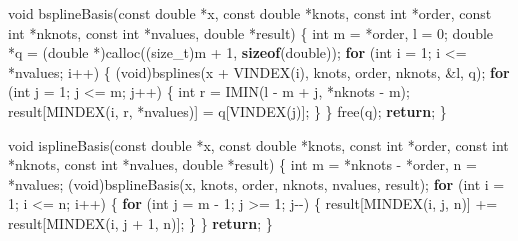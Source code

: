 \documentclass[
  12pt,
]{article}
\newenvironment{Shaded}{\begin{snugshade}}{\end{snugshade}}
\newcommand{\ControlFlowTok}[1]{\textcolor[rgb]{0.13,0.29,0.53}{\textbf{#1}}}
\newcommand{\DataTypeTok}[1]{\textcolor[rgb]{0.13,0.29,0.53}{#1}}
\newcommand{\DecValTok}[1]{\textcolor[rgb]{0.00,0.00,0.81}{#1}}
\newcommand{\KeywordTok}[1]{\textcolor[rgb]{0.13,0.29,0.53}{\textbf{#1}}}
\newcommand{\NormalTok}[1]{#1}
\begin{document}
\begin{Shaded}
\begin{Highlighting}[]
\DataTypeTok{void}\NormalTok{ bsplineBasis(}\DataTypeTok{const} \DataTypeTok{double}\NormalTok{ *x, }\DataTypeTok{const} \DataTypeTok{double}\NormalTok{ *knots, }\DataTypeTok{const} \DataTypeTok{int}\NormalTok{ *order,}
                  \DataTypeTok{const} \DataTypeTok{int}\NormalTok{ *nknots, }\DataTypeTok{const} \DataTypeTok{int}\NormalTok{ *nvalues, }\DataTypeTok{double}\NormalTok{ *result) \{}
    \DataTypeTok{int}\NormalTok{ m = *order, l = }\DecValTok{0}\NormalTok{;}
    \DataTypeTok{double}\NormalTok{ *q = (}\DataTypeTok{double}\NormalTok{ *)calloc((}\DataTypeTok{size\_t}\NormalTok{)m + }\DecValTok{1}\NormalTok{, }\KeywordTok{sizeof}\NormalTok{(}\DataTypeTok{double}\NormalTok{));}
    \ControlFlowTok{for}\NormalTok{ (}\DataTypeTok{int}\NormalTok{ i = }\DecValTok{1}\NormalTok{; i \textless{}= *nvalues; i++) \{}
\NormalTok{        (}\DataTypeTok{void}\NormalTok{)bsplines(x + VINDEX(i), knots, order, nknots, \&l, q);}
        \ControlFlowTok{for}\NormalTok{ (}\DataTypeTok{int}\NormalTok{ j = }\DecValTok{1}\NormalTok{; j \textless{}= m; j++) \{}
            \DataTypeTok{int}\NormalTok{ r = IMIN(l {-} m + j, *nknots {-} m);}
\NormalTok{            result[MINDEX(i, r, *nvalues)] = q[VINDEX(j)];}
\NormalTok{        \}}
\NormalTok{    \}}
\NormalTok{    free(q);}
    \ControlFlowTok{return}\NormalTok{;}
\NormalTok{\}}

\DataTypeTok{void}\NormalTok{ isplineBasis(}\DataTypeTok{const} \DataTypeTok{double}\NormalTok{ *x, }\DataTypeTok{const} \DataTypeTok{double}\NormalTok{ *knots, }\DataTypeTok{const} \DataTypeTok{int}\NormalTok{ *order,}
                  \DataTypeTok{const} \DataTypeTok{int}\NormalTok{ *nknots, }\DataTypeTok{const} \DataTypeTok{int}\NormalTok{ *nvalues, }\DataTypeTok{double}\NormalTok{ *result) \{}
    \DataTypeTok{int}\NormalTok{ m = *nknots {-} *order, n = *nvalues;}
\NormalTok{    (}\DataTypeTok{void}\NormalTok{)bsplineBasis(x, knots, order, nknots, nvalues, result);}
    \ControlFlowTok{for}\NormalTok{ (}\DataTypeTok{int}\NormalTok{ i = }\DecValTok{1}\NormalTok{; i \textless{}= n; i++) \{}
        \ControlFlowTok{for}\NormalTok{ (}\DataTypeTok{int}\NormalTok{ j = m {-} }\DecValTok{1}\NormalTok{; j \textgreater{}= }\DecValTok{1}\NormalTok{; j{-}{-}) \{}
\NormalTok{            result[MINDEX(i, j, n)] += result[MINDEX(i, j + }\DecValTok{1}\NormalTok{, n)];}
\NormalTok{        \}}
\NormalTok{    \}}
    \ControlFlowTok{return}\NormalTok{;}
\NormalTok{\}}


\end{Highlighting}
\end{Shaded}
\end{document}

